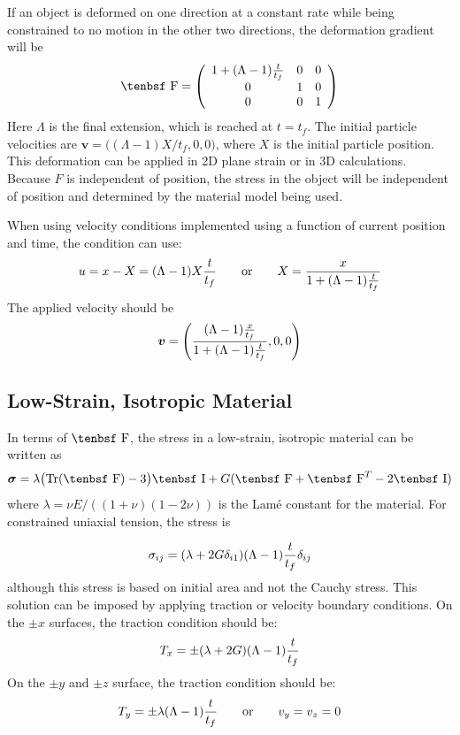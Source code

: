 \documentclass[11pt]{book}
\renewcommand{\vec}[1]{\boldsymbol{#1}}
\newcommand{\tens}[1]{\boldsymbol{\mathsf{#1}}}
\def\F{\hbox{\tenbsf F}}
\def\I{\hbox{\tenbsf I}}
\begin{document}
If an object is deformed on one direction at a constant rate while being constrained to no motion in the other two directions, the deformation gradient will be
\begin{equation}
    \F = \left(\begin{array}{ccc} 1+(\Lambda-1){t\over t_f} & 0 & 0 \\
               0 & 1 & 0 \\
               0 & 0 & 1 \end{array} \right)
\end{equation}
Here $\Lambda$ is the final extension, which is reached at $t=t_f$. The initial particle velocities are $\vec v = \bigl((\Lambda-1)X/t_f,0,0\bigr)$, where $X$ is the initial particle position. This deformation can be applied in 2D plane strain or in 3D calculations. Because $F$ is independent of position, the stress in the object will be independent of position and determined by the material model being used.

When using velocity conditions implemented using a function of current position and time, the condition can use:
\begin{equation}
     u = x-X = (\Lambda-1)X{t\over t_f} \qquad{\rm or} \qquad X = {x\over 1+ (\Lambda-1){t\over t_f}}
\end{equation}
The applied velocity should be
\begin{equation}
     \vec v = \left({(\Lambda-1){x\over t_f}\over 1+ (\Lambda-1){t\over t_f}},0,0\right)
\end{equation}


\subsection{Low-Strain, Isotropic Material}

In terms of $\F$, the stress in a low-strain, isotropic material can be written as
\begin{equation}
    \tens{\sigma} = \lambda \bigl({\rm Tr}(\F)-3\bigr)\I + G(\F + \F^T -2\I)
\end{equation}
where $\lambda = \nu E/((1+\nu)(1-2\nu))$ is the Lam\'e constant for the material. For constrained uniaxial tension, the stress is

\begin{equation}
    \sigma_{ij} = (\lambda  + 2G\delta_{i1})(\Lambda-1){t\over t_f}\delta_{ij}
\end{equation}
although this stress is based on initial area and not the Cauchy stress. This solution can be imposed by applying traction or velocity boundary conditions. On the $\pm x$ surfaces, the traction condition should be:
\begin{equation}
            T_x = \pm (\lambda  + 2G)(\Lambda-1){t\over t_f} 
\end{equation}
On the $\pm y$ and $\pm z$ surface, the traction condition should be:
\begin{equation}
            T_y = \pm \lambda(\Lambda-1){t\over t_f}   \qquad{\rm or}\qquad v_y = v_z = 0
\end{equation}
\end{document}
